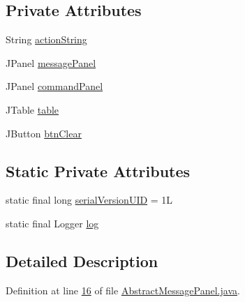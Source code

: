 \subsection*{Private Attributes}
\begin{DoxyCompactItemize}
\item 
String \hyperlink{classcom_1_1poly_1_1nlp_1_1filekommander_1_1views_1_1panels_1_1_abstract_message_panel_a295643f08d4ad315ef3fa316d304dd27}{action\-String}
\item 
J\-Panel \hyperlink{classcom_1_1poly_1_1nlp_1_1filekommander_1_1views_1_1panels_1_1_abstract_message_panel_a5f778cbc2ed9dd8c37928dbe1412a0b0}{message\-Panel}
\item 
J\-Panel \hyperlink{classcom_1_1poly_1_1nlp_1_1filekommander_1_1views_1_1panels_1_1_abstract_message_panel_aa43af4d88699d2fe9fe0c52a8b1d250c}{command\-Panel}
\item 
J\-Table \hyperlink{classcom_1_1poly_1_1nlp_1_1filekommander_1_1views_1_1panels_1_1_abstract_message_panel_ab00e095308fb951695dc4fefe0d86cb3}{table}
\item 
J\-Button \hyperlink{classcom_1_1poly_1_1nlp_1_1filekommander_1_1views_1_1panels_1_1_abstract_message_panel_af85293e132ba96e5c707b39c418260c3}{btn\-Clear}
\end{DoxyCompactItemize}
\subsection*{Static Private Attributes}
\begin{DoxyCompactItemize}
\item 
static final long \hyperlink{classcom_1_1poly_1_1nlp_1_1filekommander_1_1views_1_1panels_1_1_abstract_message_panel_a865c3834ea52d557283acefd0d2c855c}{serial\-Version\-U\-I\-D} = 1\-L
\item 
static final Logger \hyperlink{classcom_1_1poly_1_1nlp_1_1filekommander_1_1views_1_1panels_1_1_abstract_message_panel_a8f8836218e523baaab4c65c0bc9b1f7e}{log}
\end{DoxyCompactItemize}


\subsection{Detailed Description}


Definition at line \hyperlink{L16}{16} of file \hyperlink{}{Abstract\-Message\-Panel.\-java}.




